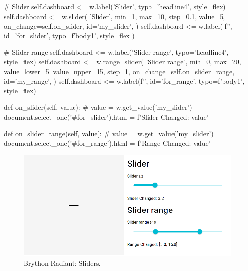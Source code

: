 \begin{python}
    # Slider
    self.dashboard <= w.label('Slider', typo='headline4', style=flex)
    self.dashboard <= w.slider(
        'Slider',
        min=1,
        max=10,
        step=0.1,
        value=5,
        on_change=self.on_slider,
        id='my_slider',
    )
    self.dashboard <= w.label(
        f'', id='for_slider', typo=f'body1', style=flex
    )

    # Slider range
    self.dashboard <= w.label('Slider range', typo='headline4', style=flex)
    self.dashboard <= w.range_slider(
        'Slider range',
        min=0,
        max=20,
        value_lower=5,
        value_upper=15,
        step=1,
        on_change=self.on_slider_range,
        id='my_range',
    )
    self.dashboard <= w.label(f'', id='for_range', typo=f'body1', style=flex)


def on_slider(self, value):
    # value = w.get_value('my_slider')
    document.select_one('#for_slider').html = f'Slider Changed: {value}'


def on_slider_range(self, value):
    # value = w.get_value('my_slider')
    document.select_one('#for_range').html = f'Range Changed: {value}'
\end{python}


\begin{figure}[H]
\begin{centering}
\includegraphics[scale=0.5]{Cap4/Figures/widgets/sliders.png}
\par\end{centering}
\caption[Brython Radiant: Slider]{Brython Radiant: Sliders.}
\label{fig:radiant_sliders}
\end{figure}